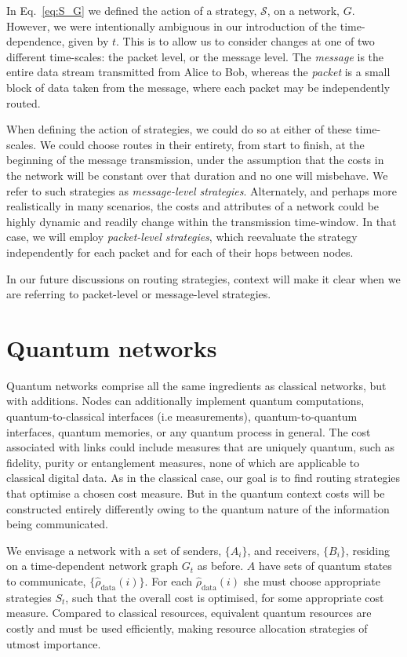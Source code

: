 \documentclass[aps,rmp,twocolumn,amsmath,amssymb,nofootinbib,superscriptaddress,longbibliography,floatfix]{revtex4-1}
\begin{document}
In Eq.~\ref{eq:S_G} we defined the action of a strategy, $\mathcal{S}$, on a network, $G$. However, we were intentionally ambiguous in our introduction of the time-dependence, given by $t$. This is to allow us to consider changes at one of two different time-scales: the packet level, or the message level. The \emph{message} is the entire data stream transmitted from Alice to Bob, whereas the \emph{packet} is a small block of data taken from the message, where each packet may be independently routed.

When defining the action of strategies, we could do so at either of these time-scales. We could choose routes in their entirety, from start to finish, at the beginning of the message transmission, under the assumption that the costs in the network will be constant over that duration and no one will misbehave. We refer to such strategies as \emph{message-level strategies}. Alternately, and perhaps more realistically in many scenarios, the costs and attributes of a network could be highly dynamic and readily change within the transmission time-window. In that case, we will employ \emph{packet-level strategies}, which reevaluate the strategy independently for each packet and for each of their hops between nodes.

In our future discussions on routing strategies, context will make it clear when we are referring to packet-level or message-level strategies.

%
%

\section{Quantum networks} \label{sec:quant_net}

Quantum networks comprise all the same ingredients as classical networks, but with additions. Nodes can additionally implement quantum computations, quantum-to-classical interfaces (i.e measurements), quantum-to-quantum interfaces, quantum memories, or any quantum process in general. The cost associated with links could include measures that are uniquely quantum, such as fidelity, purity or entanglement measures, none of which are applicable to classical digital data. As in the classical case, our goal is to find routing strategies that optimise a chosen cost measure. But in the quantum context costs will be constructed entirely differently owing to the quantum nature of the information being communicated.

We envisage a network with a set of senders, $\{A_i\}$, and receivers, $\{B_i\}$, residing on a time-dependent network graph $G_t$ as before. $A$ have sets of quantum states to communicate, $\{\hat\rho_\mathrm{data}(i)\}$. For each $\hat\rho_\mathrm{data}(i)$ she must choose appropriate strategies $S_t$, such that the overall cost is optimised, for some appropriate cost measure. Compared to classical resources, equivalent quantum resources are costly and must be used efficiently, making resource allocation strategies of utmost importance.
\end{document}
